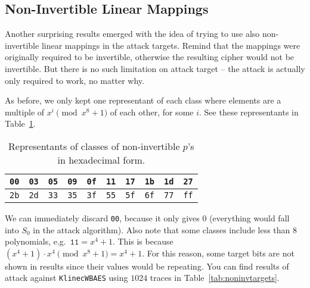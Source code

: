 
\subsection{Non-Invertible Linear Mappings}
\label{sec:noninv}

Another surprising results emerged with the idea of trying to use also non-invertible linear mappings in the attack targets. Remind that the mappings were originally required to be invertible, otherwise the resulting cipher would not be invertible. But there is no such limitation on attack target -- the attack is actually only required to work, no matter why.

As before, we only kept one representant of each class where elements are a multiple of $x^i\pmod{x^8+1}$ of each other, for some $i$. See these representants in Table~\ref{tab:classreprenoninv}.

\begin{table}[h]
	\begin{center}
	\begin{tabular}{| c | c | c | c | c | c | c | c | c | c |}
		\hline
		{\tt 00} & {\tt 03} & {\tt 05} & {\tt 09} & {\tt 0f} & {\tt 11} & {\tt 17} & {\tt 1b} & {\tt 1d} & {\tt 27} \\
		\hline
		{\tt 2b} & {\tt 2d} & {\tt 33} & {\tt 35} & {\tt 3f} & {\tt 55} & {\tt 5f} & {\tt 6f} & {\tt 77} & {\tt ff} \\
		\hline
	\end{tabular}
	\end{center}
\caption{Representants of classes of non-invertible $p$'s in hexadecimal form.}
\label{tab:classreprenoninv}
\end{table}

We can immediately discard {\tt 00}, because it only gives $0$ (everything would fall into $S_0$ in the attack algorithm). Also note that some classes include less than $8$ polynomials, e.g.\ $\texttt{11} = x^4+1$. This is because $(x^4+1)\cdot x^4 \pmod{x^8+1} = x^4+1$. For this reason, some target bits are not shown in results since their values would be repeating. You can find results of attack against {\tt KlinecWBAES} using $1024$ traces in Table~\ref{tab:noninvtargets}.



